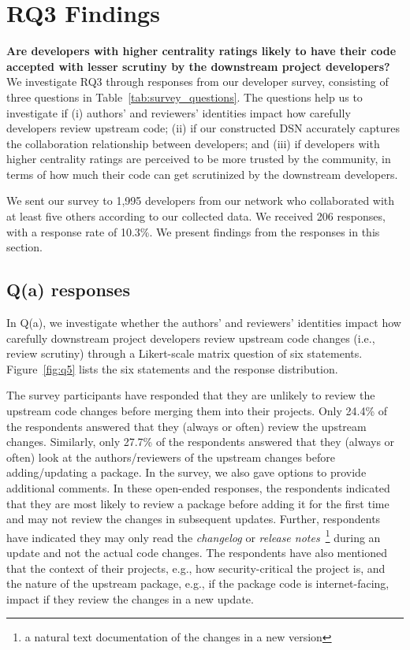 \documentclass[10pt,journal,compsoc]{IEEEtran}
\begin{document}
\section{RQ3 Findings}
\label{sec:rq3}
\textbf{Are developers with higher centrality ratings likely to have their code accepted with lesser scrutiny by the downstream project developers?}
We investigate RQ3 through responses from our developer survey, consisting of three questions in Table~\ref{tab:survey_questions}. The questions help us to investigate if (i) authors' and reviewers' identities impact how carefully developers review upstream code; (ii) if our constructed DSN accurately captures the collaboration relationship between developers; and (iii) if developers with higher centrality ratings are perceived to be more trusted by the community, in terms of how much their code can get scrutinized by the downstream developers.

We sent our survey to 1,995 developers from our network who collaborated with at least five others according to our collected data. We received 206 responses, with a response rate of 10.3\%. We present findings from the responses in this section.

\subsection{Q(a) responses}


In Q(a), we investigate whether the authors' and reviewers' identities impact how carefully downstream project developers review upstream code changes (i.e., review scrutiny) through a Likert-scale matrix question of six statements. Figure~\ref{fig:q5} lists the six statements and the response distribution. 

The survey participants have responded that they are unlikely to review the upstream code changes before merging them into their projects. Only 24.4\% of the respondents answered that they (always or often) review the upstream changes. Similarly, only 27.7\% of the respondents answered that they (always or often) look at the authors/reviewers of the upstream changes before adding/updating a package. In the survey, we also gave options to provide additional comments. In these open-ended responses, the respondents indicated that they are most likely to review a package before adding it for the first time and may not review the changes in subsequent updates. Further, respondents have indicated they may only read the \textit{changelog} or \textit{release notes}~\footnote{a natural text documentation of the changes in a new version} during an update and not the actual code changes. The respondents have also mentioned that the context of their projects, e.g., how security-critical the project is, and the nature of the upstream package, e.g., if the package code is internet-facing, impact if they review the changes in a new update.
\end{document}
